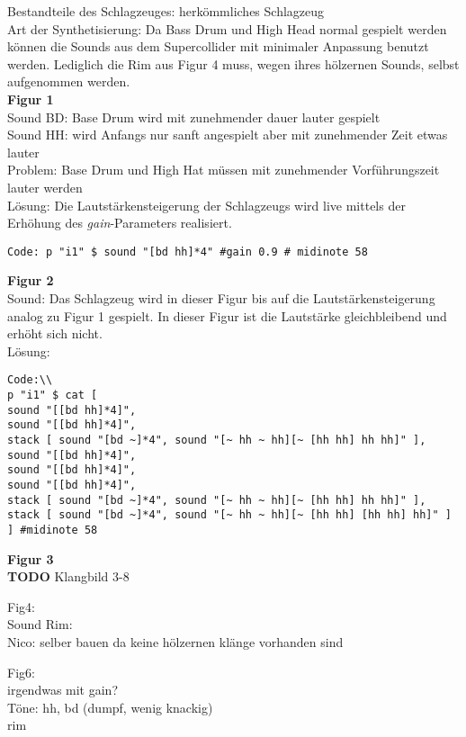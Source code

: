 \documentclass[
10pt, %
a4paper, %
oneside, %
headinclude,footinclude, %
BCOR5mm, %
]{scrartcl}
\begin{document}
\noindent Bestandteile des Schlagzeuges: herkömmliches Schlagzeug\\
Art der Synthetisierung: Da Bass Drum und High Head normal gespielt werden können die Sounds aus dem Supercollider 
mit minimaler Anpassung benutzt werden. Lediglich die Rim aus Figur 4 muss, wegen ihres hölzernen Sounds, selbst 
aufgenommen werden.\\
\noindent \textbf{Figur 1}\\
Sound BD: Base Drum wird mit zunehmender dauer lauter gespielt\\
Sound HH: wird Anfangs nur sanft angespielt aber mit zunehmender Zeit etwas lauter\\
Problem: Base Drum und High Hat müssen mit zunehmender Vorführungszeit lauter werden\\ 
Lösung: Die Lautstärkensteigerung der Schlagzeugs wird live mittels der Erhöhung des \textit{gain}-Parameters realisiert.\\
\begin{lstlisting}
Code: p "i1" $ sound "[bd hh]*4" #gain 0.9 # midinote 58
\end{lstlisting}
\noindent \textbf{Figur 2}\\
Sound: Das Schlagzeug wird in dieser Figur bis auf die Lautstärkensteigerung analog zu Figur 1 gespielt. In dieser Figur ist die Lautstärke gleichbleibend
und erhöht sich nicht.\\
Lösung:\\
\begin{lstlisting}
Code:\\
p "i1" $ cat [
sound "[[bd hh]*4]",
sound "[[bd hh]*4]",
stack [ sound "[bd ~]*4", sound "[~ hh ~ hh][~ [hh hh] hh hh]" ],
sound "[[bd hh]*4]",
sound "[[bd hh]*4]",
sound "[[bd hh]*4]",
stack [ sound "[bd ~]*4", sound "[~ hh ~ hh][~ [hh hh] hh hh]" ],
stack [ sound "[bd ~]*4", sound "[~ hh ~ hh][~ [hh hh] [hh hh] hh]" ]
] #midinote 58
\end{lstlisting}
\noindent \textbf{Figur 3}\\

{\color{red}\textbf{TODO}} Klangbild 3-8

Fig4:\\
Sound Rim: \\
Nico: selber bauen da keine hölzernen klänge vorhanden sind

Fig6:\\
irgendwas mit gain?\\



Töne: hh, bd (dumpf, wenig knackig)\\
rim
\end{document}
